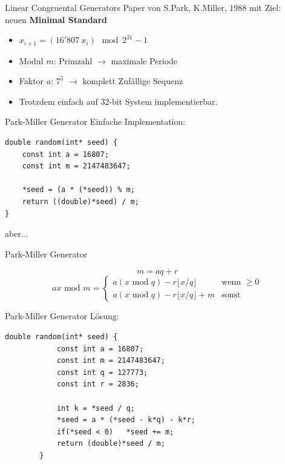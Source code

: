 \documentclass{beamer}
\begin{document}
\begin{frame}{Linear Congruental Generators}
	Paper von S.Park, K.Miller, 1988 mit Ziel: \\ neuen \textbf{Minimal Standard}
	
	\begin{itemize}
		\item<2-> $x_{i+1} = \left( 16'807 \: x_i \right) \mod{2^{31}-1}$ 
		\item<3-> Modul $m$: Primzahl $\rightarrow$ maximale Periode
		\item<4-> Faktor $a$: $7^5$ $\rightarrow$ komplett Zufällige Sequenz
		\item<5-> Trotzdem einfach auf 32-bit System implementierbar.
	\end{itemize}
\end{frame}
\begin{frame}[fragile]{Park-Miller Generator}
	Einfache Implementation: \vspace{0.5cm}
	\begin{lstlisting}[style=C]
double random(int* seed) {
    const int a = 16807;
    const int m = 2147483647;
	
    *seed = (a * (*seed)) % m;
    return ((double)*seed) / m;
}
	\end{lstlisting}
	\vspace{0.5cm}
	aber...
\end{frame}
\begin{frame}{Park-Miller Generator}

	\begin{equation*}
		m = aq + r
	\end{equation*}
	\begin{equation*}
		a x \text{ mod } m = 
			\begin{cases}
				a \left(x \text{ mod } q\right) - r \lfloor x / q\rfloor & \text{wenn }\geq 0 \\
				a \left(x \text{ mod } q\right) - r \lfloor x / q\rfloor + m & \text{sonst}
			\end{cases}
	\end{equation*}
\end{frame}
\begin{frame}[fragile]{Park-Miller Generator}
	Lösung: \vspace{0.5cm}
	\begin{lstlisting}[style=C]
		double random(int* seed) {
		    const int a = 16807;
		    const int m = 2147483647;
		    const int q = 127773;
		    const int r = 2836;
			
		    int k = *seed / q;
		    *seed = a * (*seed - k*q) - k*r;
		    if(*seed < 0)   *seed += m;
		    return (double)*seed / m;
		}
	\end{lstlisting}
\end{frame}
\end{document}
